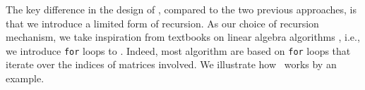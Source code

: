 The key difference in the design of \langfor, compared to the two previous approaches, is that we introduce a limited form of recursion. As our choice of recursion mechanism, we take inspiration from textbooks on linear algebra algorithms \cite{}, i.e., we introduce \texttt{for} loops to \lang. Indeed, most algorithm are based on \texttt{for} loops that iterate over the indices of matrices involved. We illustrate how \langfor\ works by an example.
%
%
%


